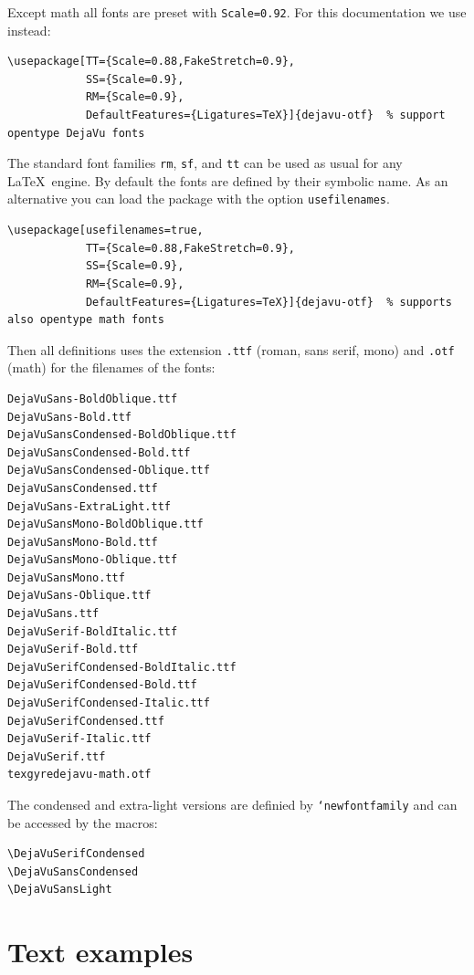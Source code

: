 \documentclass[11pt]{article}
\DeclareRobustCommand\cs[1]{\mbox{\texttt{\char`\\#1}}}
\begin{document}
\bigskip
Except math all fonts are preset with \texttt{Scale=0.92}. For this documentation
we use instead:

\begin{verbatim}
\usepackage[TT={Scale=0.88,FakeStretch=0.9},
            SS={Scale=0.9},
            RM={Scale=0.9},
            DefaultFeatures={Ligatures=TeX}]{dejavu-otf}  % support opentype DejaVu fonts
\end{verbatim}


The standard font families \texttt{rm}, \texttt{sf}, and \texttt{tt} 
can be used as usual for any \LaTeX\  engine. 
By default the fonts are defined by their symbolic name. As an alternative you can load 
the package with the option \texttt{usefilenames}. 

\begin{verbatim}
\usepackage[usefilenames=true,
            TT={Scale=0.88,FakeStretch=0.9},
            SS={Scale=0.9},
            RM={Scale=0.9},
            DefaultFeatures={Ligatures=TeX}]{dejavu-otf}  % supports also opentype math fonts
\end{verbatim}


Then all definitions uses the
extension \texttt{.ttf} (roman, sans serif, mono)  and  \texttt{.otf} (math)  for the filenames of the fonts:

\begin{verbatim}
DejaVuSans-BoldOblique.ttf
DejaVuSans-Bold.ttf
DejaVuSansCondensed-BoldOblique.ttf
DejaVuSansCondensed-Bold.ttf
DejaVuSansCondensed-Oblique.ttf
DejaVuSansCondensed.ttf
DejaVuSans-ExtraLight.ttf
DejaVuSansMono-BoldOblique.ttf
DejaVuSansMono-Bold.ttf
DejaVuSansMono-Oblique.ttf
DejaVuSansMono.ttf
DejaVuSans-Oblique.ttf
DejaVuSans.ttf
DejaVuSerif-BoldItalic.ttf
DejaVuSerif-Bold.ttf
DejaVuSerifCondensed-BoldItalic.ttf
DejaVuSerifCondensed-Bold.ttf
DejaVuSerifCondensed-Italic.ttf
DejaVuSerifCondensed.ttf
DejaVuSerif-Italic.ttf
DejaVuSerif.ttf
texgyredejavu-math.otf
\end{verbatim}

The condensed and extra-light versions are definied by \cs{newfontfamily} and can be accessed by
the macros:


\begin{verbatim}
\DejaVuSerifCondensed
\DejaVuSansCondensed
\DejaVuSansLight
\end{verbatim}




\section{Text examples}
\end{document}
